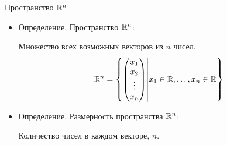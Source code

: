 \begin{frame}{Пространство $\mathbb{R}^n$}

\begin{itemize}[<+->]
  \item Определение. \alert{Пространство $\mathbb{R}^n$:}

     Множество всех возможных векторов из $n$ чисел. 
 \[
 \mathbb{R}^n = \left\{ \begin{pmatrix}
 x_1 \\
 x_2 \\
 \vdots \\
 x_n \\
 \end{pmatrix} \middle| x_1 \in \mathbb{R}, \ldots, x_n \in \mathbb{R}
   \right\}  
 \]

\item Определение. \alert{Размерность} пространства $\mathbb{R}^n$:

    Количество чисел в каждом векторе, $n$.
\end{itemize}
\end{frame}







